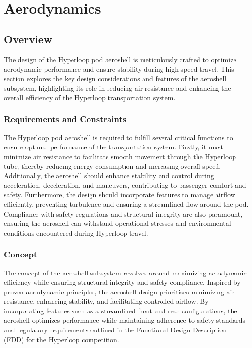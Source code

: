 \section{Aerodynamics}


\subsection{Overview}
The design of the Hyperloop pod aeroshell is meticulously crafted to optimize aerodynamic performance and ensure stability during high-speed travel. This section explores the key design considerations and features of the aeroshell subsystem, highlighting its role in reducing air resistance and enhancing the overall efficiency of the Hyperloop transportation system.

\subsubsection{Requirements and Constraints}
The Hyperloop pod aeroshell is required to fulfill several critical functions to ensure optimal performance of the transportation system. Firstly, it must minimize air resistance to facilitate smooth movement through the Hyperloop tube, thereby reducing energy consumption and increasing overall speed. Additionally, the aeroshell should enhance stability and control during acceleration, deceleration, and maneuvers, contributing to passenger comfort and safety. Furthermore, the design should incorporate features to manage airflow efficiently, preventing turbulence and ensuring a streamlined flow around the pod. Compliance with safety regulations and structural integrity are also paramount, ensuring the aeroshell can withstand operational stresses and environmental conditions encountered during Hyperloop travel.

\subsubsection{Concept}
The concept of the aeroshell subsystem revolves around maximizing aerodynamic efficiency while ensuring structural integrity and safety compliance. Inspired by proven aerodynamic principles, the aeroshell design prioritizes minimizing air resistance, enhancing stability, and facilitating controlled airflow. By incorporating features such as a streamlined front and rear configurations, the aeroshell optimizes performance while maintaining adherence to safety standards and regulatory requirements outlined in the Functional Design Description (FDD) for the Hyperloop competition.

